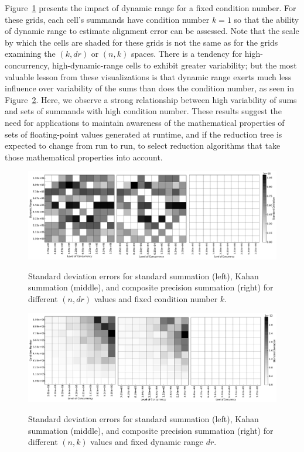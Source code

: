 Figure~\ref{fig:n_vs_dr} presents the impact of dynamic range for a
fixed condition number. For these grids, each cell's summands have
condition number $k=1$ so that the ability of dynamic range to
estimate alignment error can be assessed. Note that the
scale by which the cells are shaded for these grids is not the same as
for the grids examining the $(k, dr)$ or $(n, k)$ spaces. There is a
tendency for high-concurrency, high-dynamic-range cells to exhibit
greater variability; but the most valuable lesson from these
visualizations is that dynamic range exerts much less influence over
variability of the sums than does the condition number, as seen in
Figure~\ref{fig:n_vs_k}. Here, we observe a strong relationship
between high variability of sums and sets of summands with high
condition number. These results suggest the need for
applications to maintain awareness of the mathematical properties of
sets of floating-point values generated at runtime, and if the
reduction tree is expected to change from run to run, to select
reduction algorithms that take those mathematical properties into
account.
\begin{figure}[!htb]
\centering
\includegraphics[width=\textwidth]{chapter_2_figures/fig_NvsDr.pdf} \\
\caption{Standard deviation errors for standard summation (left),
  Kahan summation (middle), and composite precision summation (right)
  for different $(n, dr)$ values and fixed condition number $k$.}
\label{fig:n_vs_dr}
\end{figure}
\begin{figure}[!htb]
\centering
\includegraphics[width=\textwidth]{chapter_2_figures/fig_Nvsk.pdf} \\
\caption{Standard deviation errors for standard summation (left),
  Kahan summation (middle), and composite precision summation (right)
  for different $(n, k)$ values and fixed dynamic range $dr$.}
\label{fig:n_vs_k}
\end{figure}

